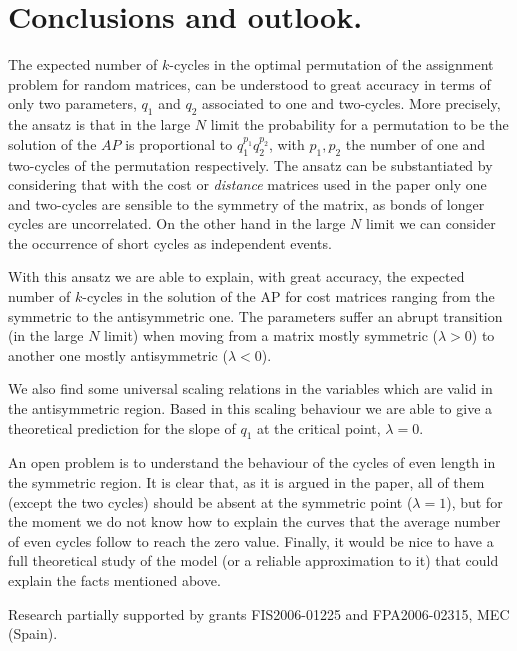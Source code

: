 \documentclass[]{iopart}
\begin{document}
\section{Conclusions and outlook.}

The expected number of $k$-cycles in the optimal 
permutation of the assignment problem for random matrices,
can be understood to great accuracy in terms of only
two parameters, $q_1$ and $q_2$ associated to one and two-cycles.
More precisely, the ansatz is that in the large $N$ limit
the probability for a permutation to be the solution of the $AP$ 
is proportional to $q_1^{p_1}q_2^{p_2}$, with $p_1, p_2$ the number
of one and two-cycles of the permutation respectively. 
The ansatz can be substantiated by considering that with the cost or 
{\it distance} matrices used in the paper only one and two-cycles
are sensible to the symmetry of the matrix, as bonds of longer cycles are 
uncorrelated. On the other hand in the large $N$ limit we can consider
the occurrence of short cycles as independent events.  

With this ansatz we are able to explain, with great accuracy,
the expected number of $k$-cycles in the solution of the AP for
cost matrices ranging from the symmetric to the antisymmetric one.  
The parameters suffer an abrupt 
transition (in the large $N$ limit)
when moving from a matrix mostly symmetric ($\lambda>0$)
to another one mostly antisymmetric ($\lambda<0$).

We also find some universal scaling relations in the variables
which are valid in the antisymmetric region.
Based in this scaling behaviour we are able to give a 
theoretical prediction for the slope of $q_1$ 
at the critical point, $\lambda=0$.

An open problem is to understand the behaviour of the cycles of even 
length in the symmetric region. It is clear that, as it is argued
in the paper, all of them  (except the two cycles) should be absent 
at the symmetric point 
($\lambda=1$), but for the moment we do not know
how to explain the curves that the average number 
of even cycles follow to reach the zero value.
Finally, it would be nice to have a full theoretical study of the model
(or a reliable approximation to it) that could 
explain the facts mentioned above.

 Research partially supported by
grants FIS2006-01225 and FPA2006-02315, MEC (Spain).
\end{document}
